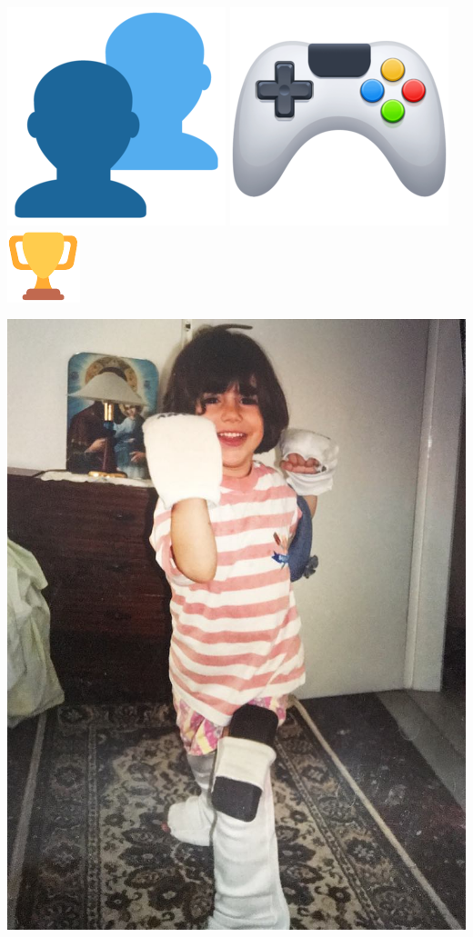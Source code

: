 \documentclass{beamer}
\begin{document}
\begin{frame}
    \centering
    \includegraphics[width=.2\textwidth]{static/players} \hspace{.6cm}
    \includegraphics[width=.2\textwidth]{static/actions} \hspace{.6cm}
    \includegraphics[width=.2\textwidth]{static/objective}
\end{frame}

\begin{frame}
    \begin{center}
    \includegraphics[width=.6\textwidth]{static/young_me}
    \end{center}
\end{frame}
\end{document}

